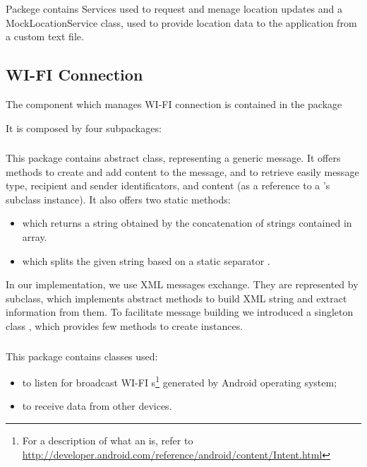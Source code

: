 Packege  contains Services used to request and menage location updates and a MockLocationService class, used to provide location data to the application from a custom text file.

\subsection{WI-FI Connection}
The component which manages WI-FI connection is contained in the package 
\begin{center}
\end{center} 
It is composed by four subpackages:
	\\
	\subsubsection{}
	This package contains  abstract class, representing a generic message. It offers methods to create and add content to the message, and to retrieve easily message type, recipient and sender identificators, and content (as a reference to a 's subclass instance). It also offers two static methods:
	\begin{itemize}
		\item {} which returns a string obtained by the concatenation of strings contained in  array.
		\item {} which splits the given string based on a static separator . 
	\end{itemize}
	In our implementation, we use XML messages exchange. They are represented by  subclass, which implements  abstract methods to build XML string and extract information from them. To facilitate message building we introduced a singleton class , which provides few methods to create  instances.
	\hfill\\
	\subsubsection{}
	This package contains classes used:
	\begin{itemize}
		\item to listen for broadcast WI-FI s\footnote{For a description of what an  is, refer to \url{http://developer.android.com/reference/android/content/Intent.html}} generated by Android operating system;
		\item to receive data from other devices.
	\end{itemize}
	
